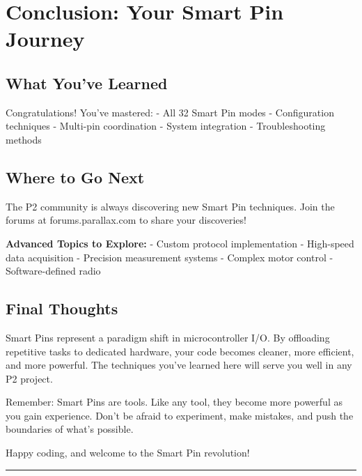 \documentclass[11pt,a4paper,oneside,english]{book}
\begin{document}
\clearpage

\hypertarget{conclusion-your-smart-pin-journey}{%
\chapter{Conclusion: Your Smart Pin
Journey}\label{conclusion-your-smart-pin-journey}}

\hypertarget{what-youve-learned}{%
\section{What You've Learned}\label{what-youve-learned}}

Congratulations! You've mastered: - All 32 Smart Pin modes -
Configuration techniques - Multi-pin coordination - System integration -
Troubleshooting methods

\hypertarget{where-to-go-next}{%
\section{Where to Go Next}\label{where-to-go-next}}

The P2 community is always discovering new Smart Pin techniques. Join
the forums at forums.parallax.com to share your discoveries!

\textbf{Advanced Topics to Explore:} - Custom protocol implementation -
High-speed data acquisition - Precision measurement systems - Complex
motor control - Software-defined radio

\hypertarget{final-thoughts}{%
\section{Final Thoughts}\label{final-thoughts}}

Smart Pins represent a paradigm shift in microcontroller I/O. By
offloading repetitive tasks to dedicated hardware, your code becomes
cleaner, more efficient, and more powerful. The techniques you've
learned here will serve you well in any P2 project.

Remember: Smart Pins are tools. Like any tool, they become more powerful
as you gain experience. Don't be afraid to experiment, make mistakes,
and push the boundaries of what's possible.

Happy coding, and welcome to the Smart Pin revolution!

\begin{center}\rule{0.5\linewidth}{0.5pt}\end{center}
\end{document}
